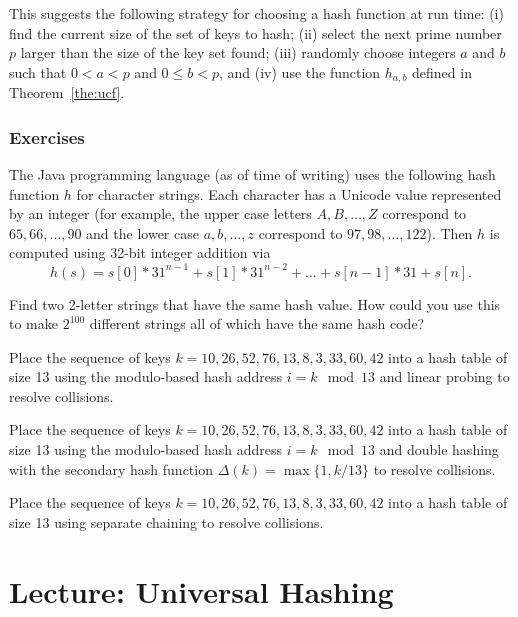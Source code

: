 This suggests the following strategy for 
choosing a hash function at run time: (i) find 
the current size of the set of keys to hash; 
(ii) select the next 
prime number \(p\) larger than the size of the key set found;
({iii}) randomly choose integers \(a\) and \(b\)
such that \(0 < a < p\) and \(0 \le b < p\), and 
({iv}) use the function \(h_{a,b}\) 
defined in Theorem~\ref{the:ucf}.


\subsection*{Exercises}

\begin{Exercise}\label{exr:java:hash}
The Java programming language (as of time of writing)
uses the following hash function $h$ for character strings. 
Each character has a Unicode value represented by an integer (for example, the 
upper case letters $A, B, \dots, Z$ correspond to $65, 66, \dots, 90$ and the 
lower case $a, b, \dots, z$ correspond to $97, 98, \dots, 122$). Then 
$h$ is computed using 32-bit integer addition via
$$h(s) = s[0]*31^{n-1} + s[1]*31^{n-2} + \dots + s[n-1]*31 + s[n].$$

Find two 2-letter strings that have the same hash value. How could you use this 
to make $2^{100}$ different strings all of which have the same hash code?
\end{Exercise}

\begin{Exercise}\label{exr:hash:oalp}
Place the sequence of keys \(k=10, 26, 52, 76, 13, 8, 3, 33, 60, 42\) 
into a hash table of size 13 using the modulo-based hash address \(i = k \mod 13\) 
and linear probing to resolve collisions.
\end{Exercise}

\begin{Exercise}\label{exr:hash:oadh}

Place the sequence of keys \(k=10, 26, 52, 76, 13, 8, 3, 33, 60, 42\) 
into a hash table of size 13 using the modulo-based hash address \(i = k \mod 13\) 
and double hashing with the secondary hash function 
\(\Delta(k)=\max\{1, k/13 \}\) to resolve collisions.
\end{Exercise}

\begin{Exercise}\label{exr:hash:sc}
Place the sequence of keys \(k=10, 26, 52, 76, 13, 8, 3, 33, 60, 42\) 
into a hash table of size 13 using separate chaining to resolve collisions.
\end{Exercise}

\chapter{Lecture: Universal Hashing}